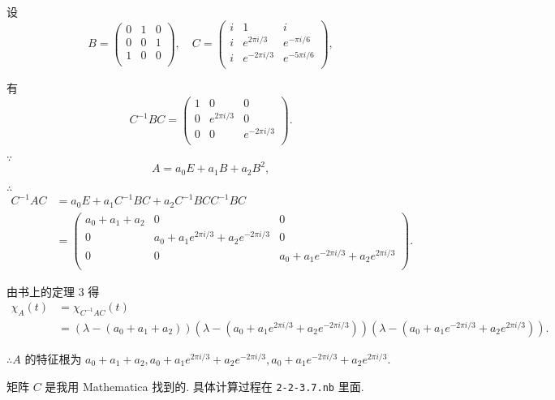\documentclass{ctexart}
\begin{document}
\begin{solution}
    设
    \[B=\begin{pmatrix}
        0 & 1 & 0 \\
        0 & 0 & 1 \\
        1 & 0 & 0 \\
    \end{pmatrix},\quad C=\begin{pmatrix}
        i & 1 & i \\
        i & e^{2\pi i/3} & e^{-\pi i/6} \\
        i & e^{-2\pi i/3} & e^{-5\pi i/6} \\
    \end{pmatrix},\]

    有
    \[C^{-1}BC=\begin{pmatrix}
        1 & 0 & 0 \\
        0 & e^{2\pi i/3} & 0 \\
        0 & 0 & e^{-2\pi i/3} \\
    \end{pmatrix}.\]

    $\because$
    \[A=a_0E+a_1B+a_2B^2,\]

    $\therefore$
    \begin{align*}
        C^{-1}AC & =a_0E+a_1C^{-1}BC+a_2C^{-1}BCC^{-1}BC \\
        & =\begin{pmatrix}
            a_0+a_1+a_2 & 0 & 0 \\
            0 & a_0+a_1e^{2\pi i/3}+a_2e^{-2\pi i/3} & 0 \\
            0 & 0 & a_0+a_1e^{-2\pi i/3}+a_2e^{2\pi i/3} \\
        \end{pmatrix}.
    \end{align*}

    由书上的定理 3 得
    \begin{align*}
        \chi_A(t) & =\chi_{C^{-1}AC}(t) \\
        & =(\lambda-(a_0+a_1+a_2))(\lambda-(a_0+a_1e^{2\pi i/3}+a_2e^{-2\pi i/3}))(\lambda-(a_0+a_1e^{-2\pi i/3}+a_2e^{2\pi i/3})).
    \end{align*}

    $\therefore A$ 的特征根为 $a_0+a_1+a_2,a_0+a_1e^{2\pi i/3}+a_2e^{-2\pi i/3},a_0+a_1e^{-2\pi i/3}+a_2e^{2\pi i/3}$.
\end{solution}
\begin{note}
    矩阵 $C$ 是我用 Mathematica 找到的. 具体计算过程在 \verb|2-2-3.7.nb| 里面.
\end{note}
\end{document}
